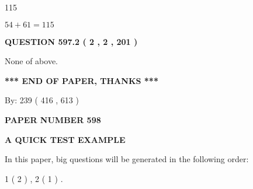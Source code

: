 \documentclass[12pt]{article}
\begin{document}
115
 
 
 
 
\noindent{}

$ %
54 +  %
61=   %
115$
 
 
  
\vspace{0.2in}
  
{\textbf{\Large{QUESTION
597.2 
 ( 2 , 2 , 201 )
}}}
  
  
 
 
\noindent{}
 
 
 None of above.
 
 
 
 
   
   
 \vspace{0.2in}
 
   
   
   
   
\vspace{1.0in} 
{\textbf{\large{ *** END OF PAPER, THANKS *** }}} 
   
   
\hspace{1.0in} By: 
 239 ( 416 ,  613 )
   
   
   
   
\newpage 
\setcounter{page}{ 
   598001 } 
   
   
   
   
 {\textbf{ \Large{ PAPER NUMBER  598  }}}
   
   
\vspace{0.2in}
   
   
   
   
   
   
 \vspace{0.2in}
{\LARGE {\textbf{ A QUICK TEST EXAMPLE}}}
   
   
   
\vspace{0.2in}
   
In this paper, big questions will be generated in the following order: 
   
   
   1 ( 2 )
 ,
   2 ( 1 )
 .
  
\vspace{0.2in}
  
\end{document}
